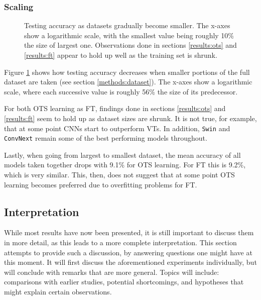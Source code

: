 \subsubsection{Scaling}

\begin{figure}[tb]
    \centering
    \def\svgwidth{\textwidth}
    
    \caption{Testing accuracy as datasets gradually become smaller. The x-axes show a logarithmic scale, with the smallest value being roughly 10\% the size of largest one. Observations done in sections \ref{results:ots} and \ref{results:ft} appear to hold up well as the training set is shrunk.}
    \label{results:img:scale}
\end{figure}

Figure \ref{results:img:scale} shows how testing accuracy decreases when smaller portions of the full dataset are taken (see section \ref{methods:dataset}). The x-axes show a logarithmic scale, where each successive value is roughly 56\% the size of its predecessor.

For both OTS learning as FT, findings done in sections \ref{results:ots} and \ref{results:ft} seem to hold up as dataset sizes are shrunk. It is not true, for example, that at some point CNNs start to outperform VTs. In addition, \texttt{Swin} and \texttt{ConvNext} remain some of the best performing models throughout. 

Lastly, when going from largest to smallest dataset, the mean accuracy of all models taken together drops with 9.1\% for OTS learning. For FT this is 9.2\%, which is very similar. This, then, does not suggest that at some point OTS learning becomes preferred due to overfitting problems for FT. %


\subsection{Interpretation} \label{exp:int} %
While most results have now been presented, it is still important to discuss them in more detail, as this leads to a more complete interpretation. This section attempts to provide such a discussion, by answering questions one might have at this moment. It will first discuss the aforementioned experiments individually, but will conclude with remarks that are more general. Topics will include: comparisons with earlier studies, potential shortcomings, and hypotheses that might explain certain observations.

